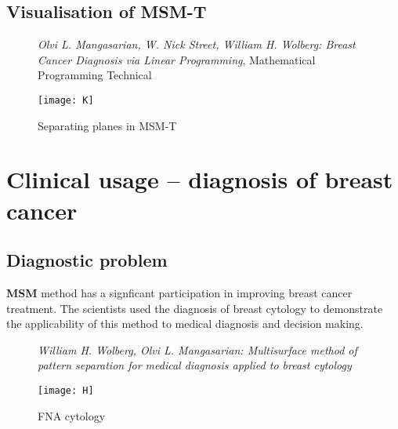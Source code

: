 \documentclass{beamer}
\begin{document}
\subsection{Visualisation of MSM-T}
\begin{frame}
\begin{figure}[h]
	\caption{\textit{Olvi L. Mangasarian, W. Nick Street, William H. Wolberg: Breast Cancer Diagnosis via Linear Programming}, Mathematical Programming Technical \cite{bcd} }
	\centering
	\texttt{[image: K]}
	\caption{Separating planes in MSM-T}\label{rys33}
	
\end{figure}
\end{frame}


\section{Clinical usage -- diagnosis of breast cancer}
\subsection{Diagnostic problem}
\textbf{MSM} method has a signficant participation in improving breast cancer treatment. The scientists used the diagnosis
of breast cytology to demonstrate the applicability of this
method to medical diagnosis and decision making. \\ 


\begin{figure}[h]

	\caption{\textit{William H. Wolberg, Olvi L. Mangasarian: Multisurface method of pattern separation for medical diagnosis applied to breast cytology }\cite{msm} }
	\centering
	\texttt{[image: H]}
	\caption{FNA cytology}
	
\end{figure}
\end{document}
